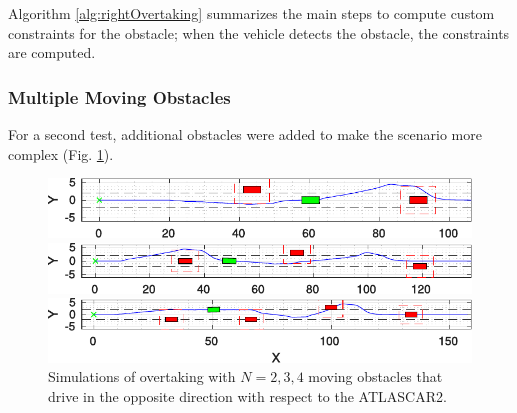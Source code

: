 \documentclass[conference,11pt]{IEEEtran}
\begin{document}
Algorithm \ref{alg:rightOvertaking} summarizes the main steps to compute custom constraints for the obstacle; when the vehicle detects the obstacle, the constraints are computed.
%
\subsubsection{Multiple Moving Obstacles}
For a second test, additional obstacles were added to make the scenario more complex (Fig. \ref{fig:obstacleAvoidance_random}).
\begin{figure}%
	\centering
	\begin{minipage}[t]{\columnwidth}
	\includegraphics[width=1\columnwidth]{./figure/random_N_obstacles/overtaking_random_2.pdf}
	\end{minipage}
	\begin{minipage}[t]{\columnwidth}
	\includegraphics[width=1\columnwidth]{./figure/random_N_obstacles/overtaking_random.pdf}
	\end{minipage}
	\begin{minipage}[t]{\columnwidth}
	\includegraphics[width=1\columnwidth]{./figure/random_N_obstacles/overtaking_random_1.pdf}
	\end{minipage}
	\vspace{-21pt}
	\caption{Simulations of overtaking with $N = 2,3,4$ moving obstacles that drive in the opposite direction with respect to the ATLASCAR2.}
	\label{fig:obstacleAvoidance_random}
\end{figure}
\end{document}
